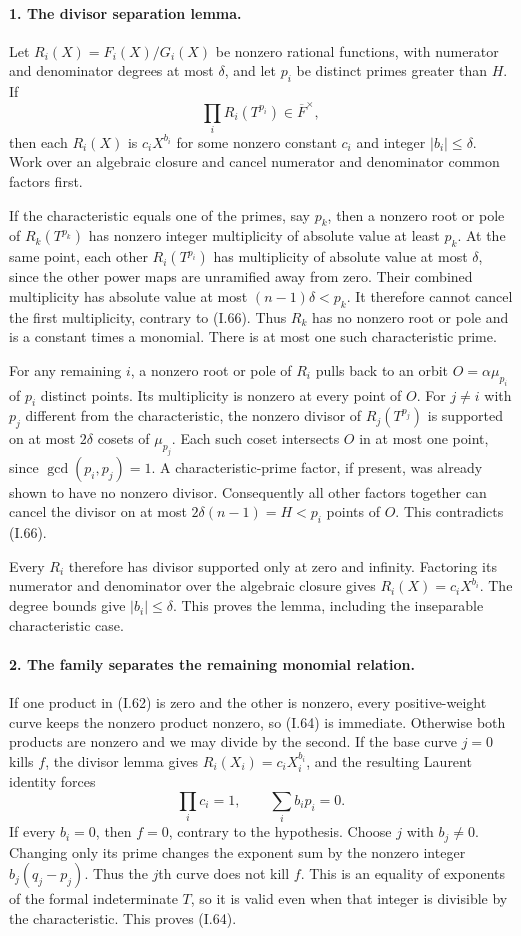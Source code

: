 \paragraph{1. The divisor separation lemma.}
Let $R_i(X)=F_i(X)/G_i(X)$ be nonzero rational functions,
with numerator and denominator degrees at most $\delta$,
and let $p_i$ be distinct primes greater than $H$.
If
\[
 \prod_i R_i(T^{p_i})\in\overline F^{\times},
 \tag{I.66}
\]
then each $R_i(X)$ is $c_iX^{b_i}$ for some nonzero
constant $c_i$ and integer $|b_i|\le\delta$.
Work over an algebraic closure and cancel numerator and
denominator common factors first.

If the characteristic equals one of the primes, say $p_k$,
then a nonzero root or pole of $R_k(T^{p_k})$ has nonzero
integer multiplicity of absolute value at least $p_k$.
At the same point, each other $R_i(T^{p_i})$ has multiplicity
of absolute value at most $\delta$, since the other power
maps are unramified away from zero.  Their combined
multiplicity has absolute value at most $(n-1)\delta<p_k$.
It therefore cannot cancel the first multiplicity, contrary
to (I.66).  Thus $R_k$ has no nonzero root or pole and is
a constant times a monomial.  There is at most one such
characteristic prime.

For any remaining $i$, a nonzero root or pole of $R_i$
pulls back to an orbit $O=\alpha\mu_{p_i}$ of $p_i$
distinct points.  Its multiplicity is nonzero at every
point of $O$.  For $j\ne i$ with $p_j$ different from the
characteristic, the nonzero divisor of $R_j(T^{p_j})$
is supported on at most $2\delta$ cosets of $\mu_{p_j}$.
Each such coset intersects $O$ in at most one point, since
$\gcd(p_i,p_j)=1$.  A characteristic-prime factor, if
present, was already shown to have no nonzero divisor.
Consequently all other factors together can cancel the
divisor on at most $2\delta(n-1)=H<p_i$ points of $O$.
This contradicts (I.66).

Every $R_i$ therefore has divisor supported only at zero
and infinity.  Factoring its numerator and denominator
over the algebraic closure gives $R_i(X)=c_iX^{b_i}$.
The degree bounds give $|b_i|\le\delta$.  This proves
the lemma, including the inseparable characteristic case.

\paragraph{2. The family separates the remaining monomial relation.}
If one product in (I.62) is zero and the other is nonzero,
every positive-weight curve keeps the nonzero product
nonzero, so (I.64) is immediate.  Otherwise both products
are nonzero and we may divide by the second.
If the base curve $j=0$ kills $f$, the divisor lemma gives
$R_i(X_i)=c_iX_i^{b_i}$, and the resulting Laurent identity
forces
\[
 \prod_i c_i=1,\qquad\sum_i b_ip_i=0.
\]
If every $b_i=0$, then $f=0$, contrary to the hypothesis.
Choose $j$ with $b_j\ne0$.  Changing only its prime changes
the exponent sum by the nonzero integer
$b_j(q_j-p_j)$.  Thus the $j$th curve does not kill $f$.
This is an equality of exponents of the formal indeterminate
$T$, so it is valid even when that integer is divisible by
the characteristic.  This proves (I.64).

